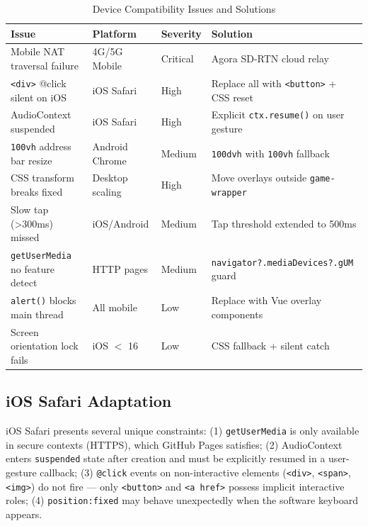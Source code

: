\documentclass[11pt,a4paper]{article}
\begin{document}
\begin{table}[H]
\centering
\caption{Device Compatibility Issues and Solutions}
\label{tab:compat}
\footnotesize
\begin{tabular}{@{}p{2.5cm}p{1.6cm}p{1.4cm}p{3.5cm}@{}}
\toprule
\textbf{Issue} & \textbf{Platform} & \textbf{Severity} & \textbf{Solution} \\
\midrule
Mobile NAT traversal failure & 4G/5G Mobile & Critical & Agora SD-RTN cloud relay \\
\texttt{<div>} @click silent on iOS & iOS Safari & High & Replace all with \texttt{<button>} + CSS reset \\
AudioContext suspended & iOS Safari & High & Explicit \texttt{ctx.resume()} on user gesture \\
\texttt{100vh} address bar resize & Android Chrome & Medium & \texttt{100dvh} with \texttt{100vh} fallback \\
CSS transform breaks fixed & Desktop scaling & High & Move overlays outside \texttt{game-wrapper} \\
Slow tap (>300ms) missed & iOS/Android & Medium & Tap threshold extended to 500ms \\
\texttt{getUserMedia} no feature detect & HTTP pages & Medium & \texttt{navigator?.mediaDevices?.gUM} guard \\
\texttt{alert()} blocks main thread & All mobile & Low & Replace with Vue overlay components \\
Screen orientation lock fails & iOS $<$ 16 & Low & CSS fallback + silent catch \\
\bottomrule
\end{tabular}
\end{table}

\subsection{iOS Safari Adaptation}

iOS Safari presents several unique constraints: (1) \texttt{getUserMedia} is only available in secure contexts (HTTPS), which GitHub Pages satisfies; (2) AudioContext enters \texttt{suspended} state after creation and must be explicitly resumed in a user-gesture callback; (3) \texttt{@click} events on non-interactive elements (\texttt{<div>}, \texttt{<span>}, \texttt{<img>}) do not fire — only \texttt{<button>} and \texttt{<a href>} possess implicit interactive roles; (4) \texttt{position:fixed} may behave unexpectedly when the software keyboard appears.
\end{document}
